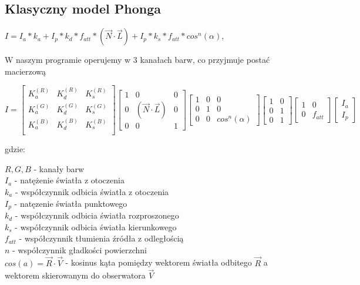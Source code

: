 \documentclass{article}
\begin{document}
\subsection{Klasyczny model Phonga}
\begin{center}
$I = I_a * k_a + I_p*k_d*f_{att}* (\vec{N} \cdot \vec{L}) + I_p * k_s* f_{att}* cos^{n}(\alpha)$, 
\end{center}
W naszym programie operujemy w 3 kanałach barw, co przyjmuje postać macierzową \\
\begin{center}
    $I=
    \begin{bmatrix}
        K_a^{(R)} & K_d^{(R)} &K_s^{(R)} \\
        K_a^{(G)} & K_d^{(G)} &K_s^{(G)} \\
        K_a^{(B)} & K_d^{(B)} &K_s^{(B)}\\
    \end{bmatrix}
    \begin{bmatrix}
        1 & 0 & 0 \\ 
        0 & (\vec{N} \cdot \vec{L}) & 0 \\ 
        0 & 0 & 1
    \end{bmatrix}
    \begin{bmatrix}
        1 & 0 & 0 \\ 
        0 & 1 & 0 \\
        0 & 0 & cos^n(\alpha)
    \end{bmatrix}
    \begin{bmatrix}
        1 & 0 \\
        0 & 1 \\ 
        0 & 1
    \end{bmatrix}
    \begin{bmatrix}
        1 & 0 \\
        0 & f_{att}
    \end{bmatrix}
    \begin{bmatrix}
        I_a \\ 
        I_p
    \end{bmatrix}$
\end{center}
gdzie:

$R,G,B$ - kanały barw \\
$I_a$ - natężenie światła z otoczenia \\
$k_a$ - współczynnik odbicia światła z otoczenia \\
$I_p$ - natęzenie światła punktowego \\
$k_d$ - współczynnik odbicia światła rozproszonego \\
$k_s$ - współczynnik odbicia światła kierunkowego \\
$f_{att}$ - współczynnik tłumienia źródła z odległością \\
$n$ - współczynnik gładkości powierzchni \\
$cos(a) = \vec{R} \cdot \vec{V}$ - kosinus kąta pomiędzy wektorem światła odbitego $\vec{R}$ a wektorem skierowanym do obserwatora $\vec{V}$
\end{document}

